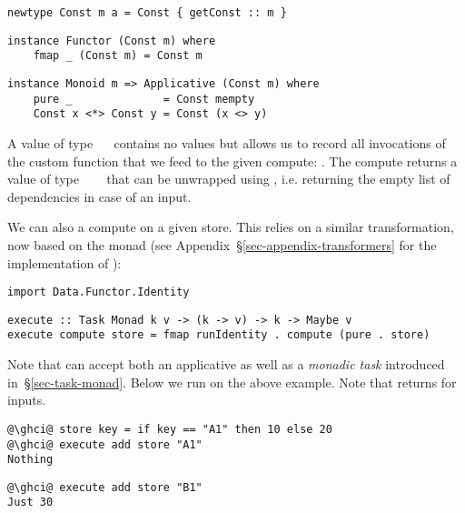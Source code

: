 \vspace{1mm}
\begin{verbatim}
newtype Const m a = Const { getConst :: m }
\end{verbatim}
\vspace{0.5mm}
\begin{verbatim}
instance Functor (Const m) where
    fmap _ (Const m) = Const m
\end{verbatim}
\vspace{0.5mm}
\begin{verbatim}
instance Monoid m => Applicative (Const m) where
    pure _              = Const mempty
    Const x <*> Const y = Const (x <> y)
\end{verbatim}
\vspace{1mm}

\noindent
A value of type ~\hs{[}\hs{k]}~ contains no values  but
allows us to record all invocations of the custom  function that we
feed to the given compute: . The compute returns a
value of type ~~\hs{[}\hs{k]}~ that can be
unwrapped using , i.e. returning the empty list of
dependencies in case of an input.

We can also  a compute on a given store. This relies on a similar
transformation, now based on the  monad (see
Appendix~\S\ref{sec-appendix-transformers} for the implementation of
):

\vspace{1mm}
\begin{verbatim}
import Data.Functor.Identity
\end{verbatim}
\vspace{0.5mm}
\begin{verbatim}
execute :: Task Monad k v -> (k -> v) -> k -> Maybe v
execute compute store = fmap runIdentity . compute (pure . store)
\end{verbatim}
\vspace{1mm}

\noindent
Note that  can accept both an applicative as well as a \emph{monadic
task} introduced in~\S\ref{sec-task-monad}. Below we run  on
the above  example. Note that  returns  for
inputs.

\vspace{1mm}
\begin{verbatim}
@\ghci@ store key = if key == "A1" then 10 else 20
@\ghci@ execute add store "A1"
Nothing
\end{verbatim}
\begin{verbatim}
@\ghci@ execute add store "B1"
Just 30
\end{verbatim}

